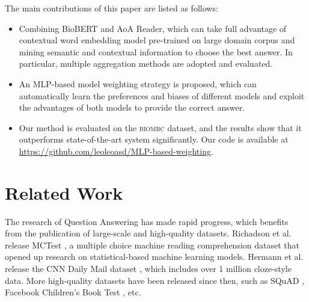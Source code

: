 \documentclass[sigconf, screen]{acmart}
\newcommand{\biomrc}{{\scshape{biomrc}}\xspace}
\newcommand{\biobert}{Bio\-BERT\xspace}
\newcommand{\aoa}{AoA Reader\xspace}
\begin{document}
The main contributions of this paper are listed as follows:
\begin{itemize}
    \item Combining \biobert and \aoa, which can take full advantage of contextual word embedding model pre-trained on large domain corpus and mining semantic and contextual information to choose the best answer. In particular, multiple aggregation methods are adopted and evaluated.
    \item An MLP-based model weighting strategy is proposed, which can automatically learn the preferences and biases of different models and exploit the advantages of both models to provide the correct answer.
    \item Our method is evaluated on the \biomrc dataset, and the results show that it outperforms state-of-the-art system significantly. Our code is available at \url{https://github.com/leoleoasd/MLP-based-weighting}.
\end{itemize}



\section{Related Work}

The research of Question Answering has made rapid progress, which benefits from the publication of large-scale and high-quality datasets. Richadson et al. release MCTest \cite{richardsonMCTestChallengeDataset2013}, a multiple choice machine reading comprehension dataset that opened up research on statistical-based machine learning models. Hermann et al. release the CNN Daily Mail dataset \cite{hermannTeachingMachinesRead2015}, which includes over 1 million cloze-style data. More high-quality datasets have been released since then, such as SQuAD \cite{rajpurkarKnowWhatYou2018,rajpurkarSQuAD1000002016}, Facebook Children's Book Test \cite{hillGoldilocksPrincipleReading2016}, etc.
\end{document}
